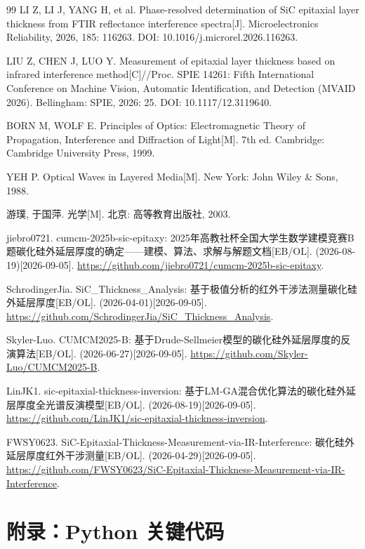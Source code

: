 \documentclass[11pt,a4paper,fontset=fandol]{ctexart}
\begin{document}
\begin{thebibliography}{99}
     LI Z, LI J, YANG H, et al. Phase-resolved determination of SiC epitaxial layer thickness from FTIR reflectance interference spectra[J]. Microelectronics Reliability, 2026, 185: 116263. DOI: 10.1016/j.microrel.2026.116263.

     LIU Z, CHEN J, LUO Y. Measurement of epitaxial layer thickness based on infrared interference method[C]//Proc. SPIE 14261: Fifth International Conference on Machine Vision, Automatic Identification, and Detection (MVAID 2026). Bellingham: SPIE, 2026: 25. DOI: 10.1117/12.3119640.

     BORN M, WOLF E. Principles of Optics: Electromagnetic Theory of Propagation, Interference and Diffraction of Light[M]. 7th ed. Cambridge: Cambridge University Press, 1999.

     YEH P. Optical Waves in Layered Media[M]. New York: John Wiley \& Sons, 1988.

     游璞, 于国萍. 光学[M]. 北京: 高等教育出版社, 2003.

     jiebro0721. cumcm-2025b-sic-epitaxy: 2025年高教社杯全国大学生数学建模竞赛B题碳化硅外延层厚度的确定——建模、算法、求解与解题文档[EB/OL]. (2026-08-19)[2026-09-05]. \url{https://github.com/jiebro0721/cumcm-2025b-sic-epitaxy}.

     SchrodingerJia. SiC\_Thickness\_Analysis: 基于极值分析的红外干涉法测量碳化硅外延层厚度[EB/OL]. (2026-04-01)[2026-09-05]. \url{https://github.com/SchrodingerJia/SiC_Thickness_Analysis}.

     Skyler-Luo. CUMCM2025-B: 基于Drude-Sellmeier模型的碳化硅外延层厚度的反演算法[EB/OL]. (2026-06-27)[2026-09-05]. \url{https://github.com/Skyler-Luo/CUMCM2025-B}.

     LinJK1. sic-epitaxial-thickness-inversion: 基于LM-GA混合优化算法的碳化硅外延层厚度全光谱反演模型[EB/OL]. (2026-08-19)[2026-09-05]. \url{https://github.com/LinJK1/sic-epitaxial-thickness-inversion}.

     FWSY0623. SiC-Epitaxial-Thickness-Measurement-via-IR-Interference: 碳化硅外延层厚度红外干涉测量[EB/OL]. (2026-04-29)[2026-09-05]. \url{https://github.com/FWSY0623/SiC-Epitaxial-Thickness-Measurement-via-IR-Interference}.

\end{thebibliography}

\newpage
\appendix
\section{附录：Python 关键代码}
\end{document}
